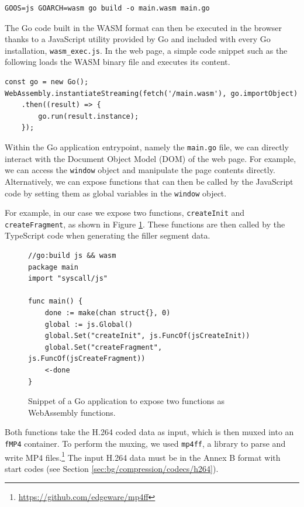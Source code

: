 \begin{verbatim}
GOOS=js GOARCH=wasm go build -o main.wasm main.go
\end{verbatim}

The Go code built in the WASM format can then be executed in the browser thanks to a JavaScript utility provided by Go and included with every Go installation, \texttt{wasm\_exec.js}. In the web page, a simple code snippet such as the following loads the WASM binary file and executes its content.

\begin{verbatim}
const go = new Go();
WebAssembly.instantiateStreaming(fetch('/main.wasm'), go.importObject)
    .then((result) => {
        go.run(result.instance);
    });
\end{verbatim}

Within the Go application entrypoint, namely the \texttt{main.go} file, we can directly interact with the Document Object Model (DOM) of the web page. For example, we can access the \texttt{window} object and manipulate the page contents directly. Alternatively, we can expose functions that can then be called by the JavaScript code by setting them as global variables in the \texttt{window} object.

For example, in our case we expose two functions, \texttt{createInit} and \texttt{createFragment}, as shown in Figure \ref{fig:wasm_go_main}. These functions are then called by the TypeScript code when generating the filler segment data.

\begin{figure}[h]
    \centering
    \begin{verbatim}
//go:build js && wasm
package main
import "syscall/js"

func main() {
	done := make(chan struct{}, 0)
	global := js.Global()
	global.Set("createInit", js.FuncOf(jsCreateInit))
	global.Set("createFragment", js.FuncOf(jsCreateFragment))
	<-done
}
    \end{verbatim}
    \caption{Snippet of a Go application to expose two functions as WebAssembly functions.}
    \label{fig:wasm_go_main}
\end{figure}

Both functions take the H.264 coded data as input, which is then muxed into an \texttt{fMP4} container. To perform the muxing, we used \texttt{mp4ff}, a library to parse and write MP4 files.\footnote{\url{https://github.com/edgeware/mp4ff}} The input H.264 data must be in the Annex B format with start codes (see Section \ref{sec:bg/compression/codecs/h264}).

